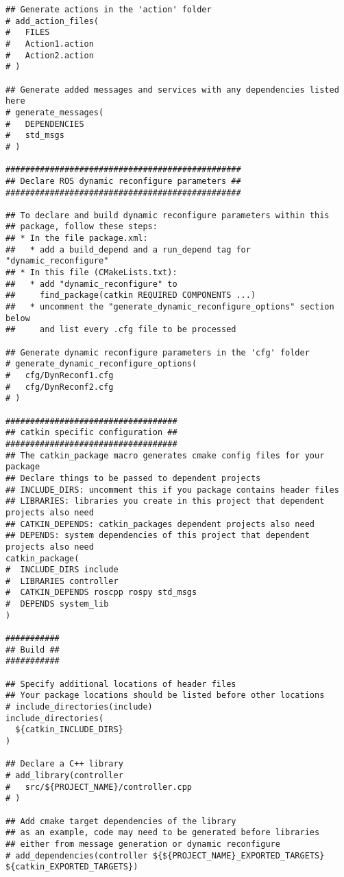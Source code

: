 \begin{lstlisting}
## Generate actions in the 'action' folder
# add_action_files(
#   FILES
#   Action1.action
#   Action2.action
# )

## Generate added messages and services with any dependencies listed here
# generate_messages(
#   DEPENDENCIES
#   std_msgs
# )

################################################
## Declare ROS dynamic reconfigure parameters ##
################################################

## To declare and build dynamic reconfigure parameters within this
## package, follow these steps:
## * In the file package.xml:
##   * add a build_depend and a run_depend tag for "dynamic_reconfigure"
## * In this file (CMakeLists.txt):
##   * add "dynamic_reconfigure" to
##     find_package(catkin REQUIRED COMPONENTS ...)
##   * uncomment the "generate_dynamic_reconfigure_options" section below
##     and list every .cfg file to be processed

## Generate dynamic reconfigure parameters in the 'cfg' folder
# generate_dynamic_reconfigure_options(
#   cfg/DynReconf1.cfg
#   cfg/DynReconf2.cfg
# )

###################################
## catkin specific configuration ##
###################################
## The catkin_package macro generates cmake config files for your package
## Declare things to be passed to dependent projects
## INCLUDE_DIRS: uncomment this if you package contains header files
## LIBRARIES: libraries you create in this project that dependent projects also need
## CATKIN_DEPENDS: catkin_packages dependent projects also need
## DEPENDS: system dependencies of this project that dependent projects also need
catkin_package(
#  INCLUDE_DIRS include
#  LIBRARIES controller
#  CATKIN_DEPENDS roscpp rospy std_msgs
#  DEPENDS system_lib
)

###########
## Build ##
###########

## Specify additional locations of header files
## Your package locations should be listed before other locations
# include_directories(include)
include_directories(
  ${catkin_INCLUDE_DIRS}
)

## Declare a C++ library
# add_library(controller
#   src/${PROJECT_NAME}/controller.cpp
# )

## Add cmake target dependencies of the library
## as an example, code may need to be generated before libraries
## either from message generation or dynamic reconfigure
# add_dependencies(controller ${${PROJECT_NAME}_EXPORTED_TARGETS} ${catkin_EXPORTED_TARGETS})


\end{lstlisting}
